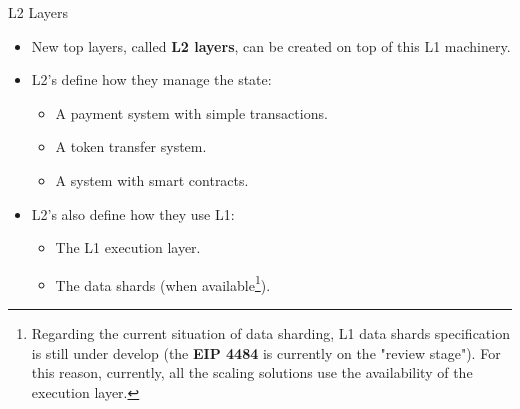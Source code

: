 \begin{frame}{L2 Layers}
\begin{itemize}
\item New top layers, called \textbf{L2 layers}, can be created on top of this L1 machinery.
\item L2's define how they manage the state: 
  \begin{itemize}
  \item A payment system with simple transactions.
  \item A token transfer system.
  \item A system with smart contracts.
  \end{itemize}
\item L2's also define how they use L1:
  \begin{itemize}
  \item The L1 execution layer.
  \item The data shards (when available\footnote{Regarding the current situation of data sharding,
  L1 data shards specification is still under develop (the \textbf{EIP 4484} is currently on the "review stage"). 
  For this reason, currently, all the scaling solutions use the availability of the execution layer.}).
  \end{itemize}
\end{itemize}
\end{frame}





